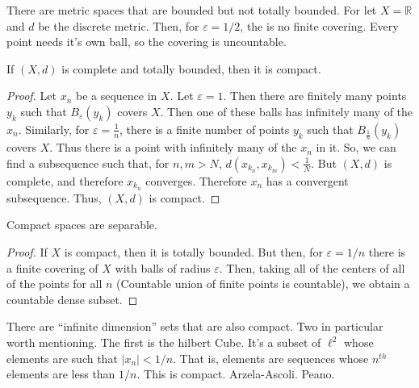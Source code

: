         There are metric spaces that are
        bounded but not totally bounded.
        For let
        $X=\mathbb{R}$ and $d$ be the
        discrete metric. Then, for
        $\varepsilon=1/2$, the is no
        finite covering. Every point needs
        it's own ball, so the covering is
        uncountable.
        \begin{theorem}
            If $(X,d)$ is complete and
            totally bounded, then it
            is compact.
        \end{theorem}
        \begin{proof}
            Let $x_{n}$ be a sequence
            in $X$. Let $\varepsilon=1$. Then
            there are finitely many points
            $y_{k}$ such that
            $B_{\varepsilon}(y_{k})$ covers
            $X$. Then one of these
            balls has infinitely many of
            the $x_{n}$. Similarly, for
            $\varepsilon=\frac{1}{n}$, there
            is a finite number of points
            $y_{k}$ such that
            $B_{\frac{1}{n}}(y_{k})$ covers
            $X$. Thus there is a point with
            infinitely many of the $x_{n}$
            in it. So, we can find a
            subsequence such that, for
            $n,m>N$,
            $d(x_{k_{n}},x_{k_{m}})<%
             \frac{1}{N}$. But $(X,d)$ is
            complete, and therefore
            $x_{k_{n}}$ converges. Therefore
            $x_{n}$ has a convergent
            subsequence. Thus, $(X,d)$ is
            compact.
        \end{proof}
        \begin{theorem}
            Compact spaces are separable.
        \end{theorem}
        \begin{proof}
            If $X$ is compact, then
            it is totally bounded. But
            then, for $\varepsilon=1/n$
            there is a finite covering of
            $X$ with balls of radius
            $\varepsilon$. Then,
            taking all of the
            centers of all of the points
            for all $n$ (Countable union
            of finite points is countable),
            we obtain a countable dense
            subset.
        \end{proof}
        \begin{example}
            There are ``infinite dimension''
            sets that are also compact. Two
            in particular worth mentioning.
            The first is the hilbert Cube.
            It's a subset of $\ell^{2}$
            whose elements are such that
            $|x_{n}|<1/n$. That is, elements
            are sequences whose $n^{th}$
            elements are less than
            $1/n$. This is compact.
            Arzela-Ascoli. Peano.
        \end{example}
